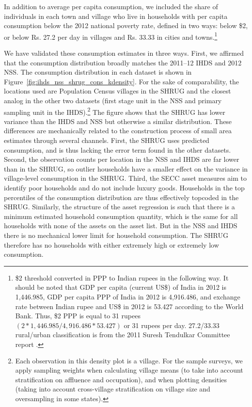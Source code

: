 \documentclass[12pt,letterpaper]{article}
\begin{document}
In addition to average per capita consumption, we included the share of individuals in each town and village who live in households with per capita consumption below the 2012 national poverty rate, defined in two ways: below \$2, or below Rs. 27.2 per day in villages and Rs. 33.33 in cities and towns.\footnote{\$2 threshold converted in PPP to Indian rupees in the following way. It should be noted that GDP per capita (current US\$) of India in 2012 is 1,446.985, GDP per capita PPP of India in 2012 is 4,916.486, and exchange rate between Indian rupee and US\$ in 2012 is 53.427 according to the World Bank. Thus, \$2 PPP is equal to 31 rupees $(2 * 1,446.985 / 4,916.486 * 53.427)$ or 31 rupees per day. 27.2/33.33 rural/urban classification is from the 2011 Suresh Tendulkar Committee report \cite{planningcommissionofindia2009}.}

We have validated these consumption estimates in three ways. First, we
affirmed that the consumption distribution broadly matches the
2011--12 IHDS and 2012 NSS. The consumption distribution in each
dataset is shown in Figure~\ref{fig:ihds_nss_shrug_cons_kdensity}. For
the sake of comparability, the locations used are Population Census
villages in the SHRUG and the closest analog in the other two datasets
(first stage unit in the NSS and primary sampling unit in the
IHDS).\footnote{Each observation in this density plot is a
  village. For the sample surveys, we apply sampling weights when
  calculating village means (to take into account stratification on
  affluence and occupation), and when plotting densities (taking into
  account cross-village stratification on village size and
  oversampling in some states).} The figure shows that the SHRUG has
lower variance than the IHDS and NSS but otherwise a similar
distribution. These differences are mechanically related to the
construction process of small area estimates through several
channels. First, the SHRUG uses predicted consumption, and is thus
lacking the error term found in the other datasets. Second, the
observation counts per location in the NSS and IHDS are far lower than
in the SHRUG, so outlier households have a smaller effect on the
variance in village-level consumption in the SHRUG. Third, the SECC
asset measures aim to identify poor households and do not include
luxury goods. Households in the top percentiles of the consumption
distribution are thus effectively topcoded in the SHRUG. Similarly,
the structure of the asset regression is such that there is a minimum
estimated household consumption quantity, which is the same for all
households with none of the assets on the asset list. But in the NSS
and IHDS there is no mechanical lower limit for household
consumption. The SHRUG therefore has no households with either
extremely high or extremely low consumption.
\end{document}
